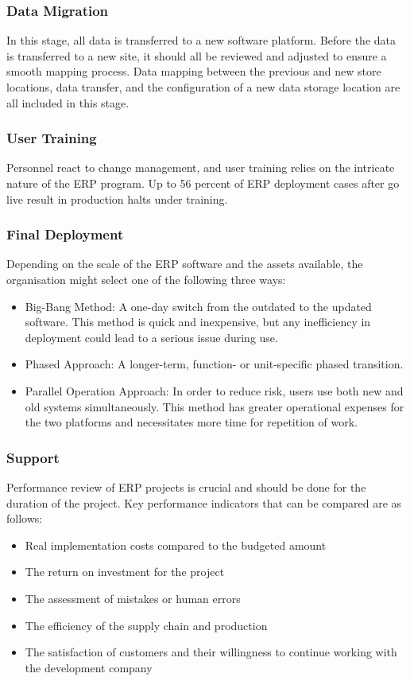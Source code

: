 \subsubsection{Data Migration}
\par{In this stage, all data is transferred to a new software platform. Before the data is transferred to a new site, it should all be reviewed and adjusted to ensure a smooth mapping process. Data mapping between the previous and new store locations, data transfer, and the configuration of a new data storage location are all included in this stage.}
\subsubsection{User Training}
\par{Personnel react to change management, and user training relies on the intricate nature of the ERP program. Up to 56 percent of ERP deployment cases after go live result in production halts under training.}
\subsubsection{Final Deployment}
\par{Depending on the scale of the ERP software and the assets available, the organisation might select one of the following three ways:}
\begin{itemize}
    \item Big-Bang Method: A one-day switch from the outdated to the updated software. This method is quick and inexpensive, but any inefficiency in deployment could lead to a serious issue during use.
    \item Phased Approach: A longer-term, function- or unit-specific phased transition.
    \item Parallel Operation Approach: In order to reduce risk, users use both new and old systems simultaneously.
    This method has greater operational expenses for the two platforms and necessitates more time for repetition of work.
\end{itemize}
\subsubsection{Support}
\par{Performance review of ERP projects is crucial and should be done for the duration of the project. Key performance indicators that can be compared are as follows:}
\begin{itemize}
    \item Real implementation costs compared to the budgeted amount
    \item The return on investment for the project
    \item The assessment of mistakes or human errors
    \item The efficiency of the supply chain and production
    \item The satisfaction of customers and their willingness to continue working with the development company
\end{itemize}
